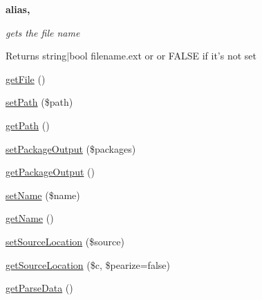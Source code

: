 \begin{Indent}{\bf alias,}\par
{\em gets the file name

\begin{DoxyReturn}{\-Returns}
string$|$bool filename.\-ext or or \-F\-A\-L\-S\-E if it's not set 
\end{DoxyReturn}
}\begin{DoxyCompactItemize}
\item 
\hyperlink{classparser_page_adf61e733be7f62a3f4bedbe7d2e02ec2}{get\-File} ()
\item 
\hyperlink{classparser_page_a5d101758b135bd36ba8992cc3bb67a24}{set\-Path} (\$path)
\item 
\hyperlink{classparser_page_a30c5c67b2bf8e2e2ccc7e361faa20afe}{get\-Path} ()
\item 
\hyperlink{classparser_page_a4c66ea9f66526da5efd974f344ee8678}{set\-Package\-Output} (\$packages)
\item 
\hyperlink{classparser_page_a125686193fc1938a56e55de068052f48}{get\-Package\-Output} ()
\item 
\hyperlink{classparser_page_a2fe666694997d047711d7653eca2f132}{set\-Name} (\$name)
\item 
\hyperlink{classparser_page_a3d0963e68bb313b163a73f2803c64600}{get\-Name} ()
\item 
\hyperlink{classparser_page_a0c5c531746956b1d7e0133640e1c001b}{set\-Source\-Location} (\$source)
\item 
\hyperlink{classparser_page_a263e11db9579a5665a2ec25fbc9b2c9c}{get\-Source\-Location} (\$c, \$pearize=false)
\item 
\hyperlink{classparser_page_ad113436ddb2b580806c763c31c2b88c1}{get\-Parse\-Data} ()
\end{DoxyCompactItemize}
\end{Indent}

